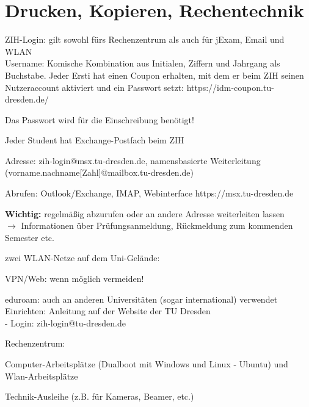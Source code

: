 \documentclass[a4paper,12pt]{report}
\begin{document}
\section{Drucken, Kopieren, Rechentechnik}
\begin{itemize*}
    \item ZIH-Login: gilt sowohl fürs Rechenzentrum als auch für jExam, Email und WLAN\\
            Username: Komische Kombination aus Initialen, Ziffern und Jahrgang als Buchstabe.
            Jeder Ersti hat einen Coupon erhalten, mit dem er beim ZIH seinen Nutzeraccount aktiviert und ein Passwort setzt: https://idm-coupon.tu-dresden.de/
    \item Das Passwort wird für die Einschreibung benötigt!
    \item Jeder Student hat Exchange-Postfach beim ZIH
    \begin{itemize*}
        \item Adresse: zih-login@msx.tu-dresden.de, namensbasierte Weiterleitung \\(vorname.nachname[Zahl]@mailbox.tu-dresden.de)
        \item Abrufen: Outlook/Exchange, IMAP, Webinterface https://msx.tu-dresden.de
        \item \textbf{Wichtig:} regelmäßig abzurufen oder an andere Adresse weiterleiten lassen\\
        $\rightarrow$ Informationen über Prüfungsanmeldung, Rückmeldung zum kommenden Semester etc.
    \end{itemize*}
    \item zwei WLAN-Netze auf dem Uni-Gelände:
    \begin{itemize*}
        \item VPN/Web: wenn möglich vermeiden!
        \item eduroam: auch an anderen Universitäten (sogar international) verwendet\\
        Einrichten: Anleitung auf der Website der TU Dresden\\
        - Login: zih-login@tu-dresden.de
    \end{itemize*}
    \item Rechenzentrum:
    \begin{itemize*}
        \item Computer-Arbeitsplätze (Dualboot mit Windows und Linux - Ubuntu) und Wlan-Arbeitsplätze
        \item Technik-Ausleihe (z.B. für Kameras, Beamer, etc.)

\end{itemize*}
\end{itemize*}
\end{document}
